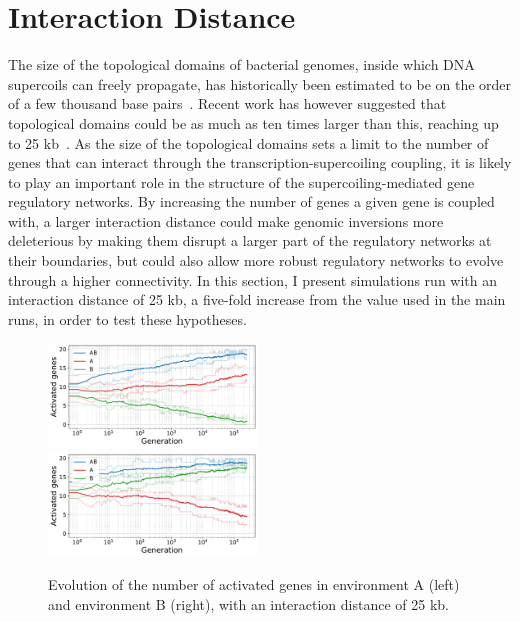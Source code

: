 \section{Interaction Distance}
\label{sec:param:inter25k}

The size of the topological domains of bacterial genomes, inside which DNA supercoils can freely propagate, has historically been estimated to be on the order of a few thousand base pairs~\citep{elhanafi2000,kouzine2013}.
Recent work has however suggested that topological domains could be as much as ten times larger than this, reaching up to 25 kb~\citep{visser2022}.
As the size of the topological domains sets a limit to the number of genes that can interact through the transcription-supercoiling coupling, it is likely to play an important role in the structure of the supercoiling-mediated gene regulatory networks.
By increasing the number of genes a given gene is coupled with, a larger interaction distance could make genomic inversions more deleterious by making them disrupt a larger part of the regulatory networks at their boundaries, but could also allow more robust regulatory networks to evolve through a higher connectivity.
In this section, I present simulations run with an interaction distance of 25 kb, a five-fold increase from the value used in the main runs, in order to test these hypotheses.

\begin{figure}[H]
\centering
\includegraphics[width=0.495\textwidth]{param/interaction-25k/gene_activity_env_A.pdf}
\includegraphics[width=0.495\textwidth]{param/interaction-25k/gene_activity_env_B.pdf}
\caption[Evolution of the number of activated genes in each environment, with an interaction distance of 25 kb]{Evolution of the number of activated genes in environment A (left) and environment B (right), with an interaction distance of 25 kb.}
\label{fig:param:inter25k-activ-by-env}
\end{figure}

